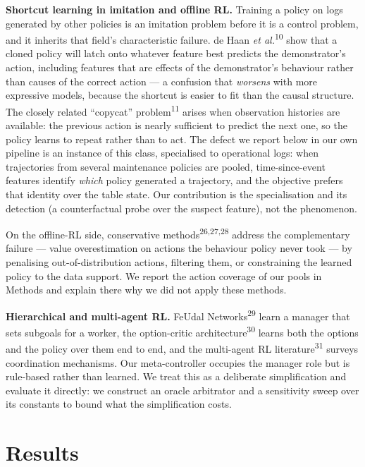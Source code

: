 \documentclass[fleqn,10pt]{wlscirep}
\begin{document}
\textbf{Shortcut learning in imitation and offline RL.}
Training a policy on logs generated by other policies is an imitation
problem before it is a control problem, and it inherits that field's
characteristic failure. de Haan \textit{et al.}\textsuperscript{10}
show that a cloned policy will latch onto whatever feature best predicts
the demonstrator's action, including features that are effects of the
demonstrator's behaviour rather than causes of the correct action --- a
confusion that \emph{worsens} with more expressive models, because the
shortcut is easier to fit than the causal structure. The closely related
``copycat'' problem\textsuperscript{11} arises when observation
histories are available: the previous action is nearly sufficient to
predict the next one, so the policy learns to repeat rather than to act.
The defect we report below in our own pipeline is an instance of this
class, specialised to operational logs: when trajectories from several
maintenance policies are pooled, time-since-event features identify
\emph{which} policy generated a trajectory, and the objective prefers
that identity over the table state. Our contribution is the
specialisation and its detection (a counterfactual probe over the
suspect feature), not the phenomenon.

On the offline-RL side, conservative
methods\textsuperscript{26,27,28} address the
complementary failure --- value overestimation on actions the behaviour
policy never took --- by penalising out-of-distribution actions, filtering
them, or constraining the learned policy to the data support. We report
the action coverage of our pools in Methods and explain there why we did
not apply these methods.

\textbf{Hierarchical and multi-agent RL.}
FeUdal Networks\textsuperscript{29} learn a manager that sets subgoals
for a worker, the option-critic architecture\textsuperscript{30} learns
both the options and the policy over them end to end, and the
multi-agent RL literature\textsuperscript{31} surveys coordination
mechanisms. Our meta-controller occupies the
manager role but is rule-based rather than learned. We treat this as a
deliberate simplification and evaluate it directly: we construct an
oracle arbitrator and a sensitivity sweep over its constants to bound
what the simplification costs.

\FloatBarrier

\section*{Results}
\label{sec:results}
\end{document}
